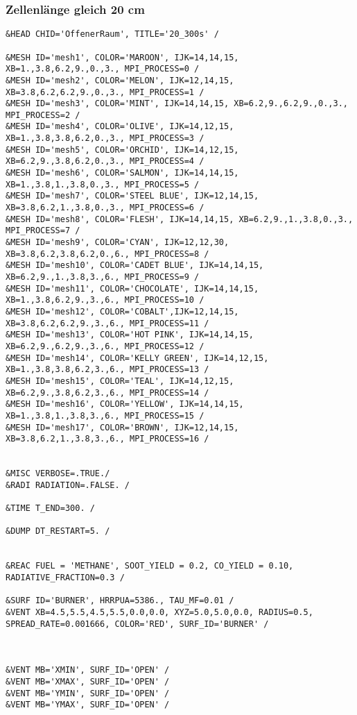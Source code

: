 \subsubsection{Zellenlänge gleich 20 cm}
\begin{lstlisting}[emptylines=0,basicstyle=\tiny]
&HEAD CHID='OffenerRaum', TITLE='20_300s' /

&MESH ID='mesh1', COLOR='MAROON', IJK=14,14,15, XB=1.,3.8,6.2,9.,0.,3., MPI_PROCESS=0 /
&MESH ID='mesh2', COLOR='MELON', IJK=12,14,15, XB=3.8,6.2,6.2,9.,0.,3., MPI_PROCESS=1 /
&MESH ID='mesh3', COLOR='MINT', IJK=14,14,15, XB=6.2,9.,6.2,9.,0.,3., MPI_PROCESS=2 /
&MESH ID='mesh4', COLOR='OLIVE', IJK=14,12,15, XB=1.,3.8,3.8,6.2,0.,3., MPI_PROCESS=3 /
&MESH ID='mesh5', COLOR='ORCHID', IJK=14,12,15, XB=6.2,9.,3.8,6.2,0.,3., MPI_PROCESS=4 /
&MESH ID='mesh6', COLOR='SALMON', IJK=14,14,15, XB=1.,3.8,1.,3.8,0.,3., MPI_PROCESS=5 /
&MESH ID='mesh7', COLOR='STEEL BLUE', IJK=12,14,15, XB=3.8,6.2,1.,3.8,0.,3., MPI_PROCESS=6 /
&MESH ID='mesh8', COLOR='FLESH', IJK=14,14,15, XB=6.2,9.,1.,3.8,0.,3., MPI_PROCESS=7 /
&MESH ID='mesh9', COLOR='CYAN', IJK=12,12,30, XB=3.8,6.2,3.8,6.2,0.,6., MPI_PROCESS=8 /
&MESH ID='mesh10', COLOR='CADET BLUE', IJK=14,14,15, XB=6.2,9.,1.,3.8,3.,6., MPI_PROCESS=9 /
&MESH ID='mesh11', COLOR='CHOCOLATE', IJK=14,14,15, XB=1.,3.8,6.2,9.,3.,6., MPI_PROCESS=10 /
&MESH ID='mesh12', COLOR='COBALT',IJK=12,14,15, XB=3.8,6.2,6.2,9.,3.,6., MPI_PROCESS=11 /
&MESH ID='mesh13', COLOR='HOT PINK', IJK=14,14,15, XB=6.2,9.,6.2,9.,3.,6., MPI_PROCESS=12 /
&MESH ID='mesh14', COLOR='KELLY GREEN', IJK=14,12,15, XB=1.,3.8,3.8,6.2,3.,6., MPI_PROCESS=13 /
&MESH ID='mesh15', COLOR='TEAL', IJK=14,12,15, XB=6.2,9.,3.8,6.2,3.,6., MPI_PROCESS=14 /
&MESH ID='mesh16', COLOR='YELLOW', IJK=14,14,15, XB=1.,3.8,1.,3.8,3.,6., MPI_PROCESS=15 /
&MESH ID='mesh17', COLOR='BROWN', IJK=12,14,15, XB=3.8,6.2,1.,3.8,3.,6., MPI_PROCESS=16 /


&MISC VERBOSE=.TRUE./
&RADI RADIATION=.FALSE. /

&TIME T_END=300. /

&DUMP DT_RESTART=5. /


&REAC FUEL = 'METHANE', SOOT_YIELD = 0.2, CO_YIELD = 0.10, RADIATIVE_FRACTION=0.3 /

&SURF ID='BURNER', HRRPUA=5386., TAU_MF=0.01 /
&VENT XB=4.5,5.5,4.5,5.5,0.0,0.0, XYZ=5.0,5.0,0.0, RADIUS=0.5, SPREAD_RATE=0.001666, COLOR='RED', SURF_ID='BURNER' /



&VENT MB='XMIN', SURF_ID='OPEN' /  
&VENT MB='XMAX', SURF_ID='OPEN' /  
&VENT MB='YMIN', SURF_ID='OPEN' /  
&VENT MB='YMAX', SURF_ID='OPEN' / 


\end{lstlisting}
